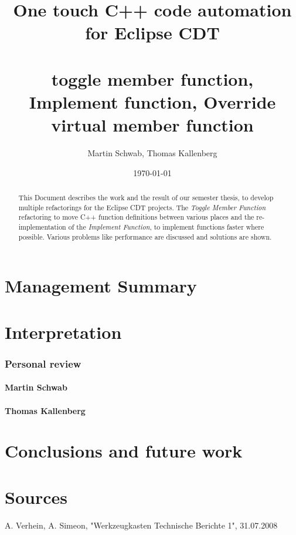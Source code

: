 \documentclass[a4paper,12pt]{scrreprt}
\title{One touch C++ code automation for Eclipse CDT \\ ~ \\ \normalsize{toggle
member function, Implement function, Override virtual member function} }
\date{\today}
\author{Martin Schwab, Thomas Kallenberg}
\begin{document}
\maketitle
{}

\begin{abstract}
\thispagestyle{empty}
This Document describes the work and the result of our semester thesis, to
develop multiple refactorings for the Eclipse CDT projects. The \textit{Toggle Member
Function} refactoring to move C++ function definitions between various places and
the re-implementation of the \textit{Implement Function}, to implement functions faster
where possible. Various problems like performance are discussed and solutions
are shown.
\end{abstract}

\chapter*{Management Summary}
\thispagestyle{empty}

\tableofcontents
\thispagestyle{empty}





\chapter{Interpretation}
\thispagestyle{fancy}

\subsection{Personal review}

\subsubsection{Martin Schwab}

\subsubsection{Thomas Kallenberg}

\chapter{Conclusions and future work}
\thispagestyle{fancy}

\chapter{Sources}
\thispagestyle{fancy}
A. Verhein, A. Simeon, "Werkzeugkasten Technische Berichte 1", 31.07.2008
\end{document}
